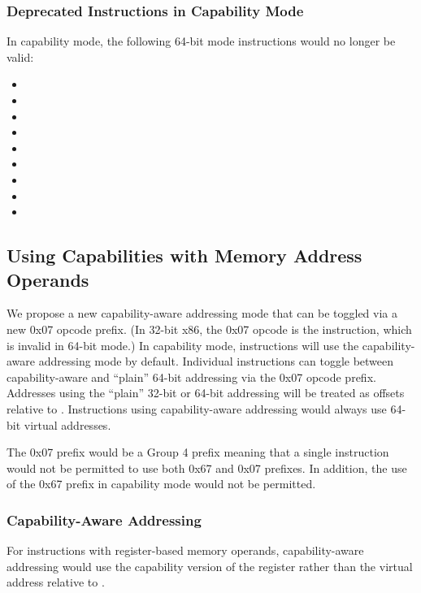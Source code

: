 \subsubsection{Deprecated Instructions in Capability Mode}

In capability mode, the following 64-bit mode instructions would no
longer be valid:

\begin{itemize}
  \item {}
  \item {}
  \item {}
  \item {}
  \item {}
  \item {}
  \item {}
  \item {}
  \item {}
\end{itemize}

\subsection{Using Capabilities with Memory Address Operands}
\label{sec:x86:capability-addressing}

We propose a new capability-aware addressing mode that can be
toggled via a new 0x07
opcode prefix.  (In 32-bit x86, the 0x07 opcode is the
 instruction, which is invalid in 64-bit mode.)
In capability mode, instructions will use
the capability-aware addressing mode by default.  Individual
instructions can toggle between capability-aware and ``plain''
64-bit addressing via the 0x07 opcode prefix.  Addresses using the
``plain'' 32-bit or 64-bit addressing will be treated as offsets
relative to \DDC{}.  Instructions using capability-aware addressing
would always use 64-bit virtual addresses.

The 0x07 prefix would be a Group 4 prefix meaning that a single
instruction would not be permitted to use both 0x67 and 0x07 prefixes.
In addition, the use of the 0x67 prefix in capability mode would not
be permitted.

\subsubsection{Capability-Aware Addressing}

For instructions with register-based memory operands, capability-aware
addressing would use the capability version of the register rather
than the virtual address relative to \DDC{}.

